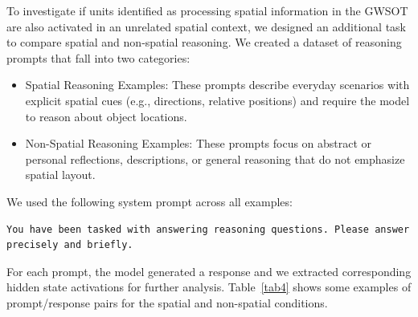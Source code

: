 \documentclass[runningheads]{llncs}
\begin{document}
To investigate if units identified as processing spatial information in the GWSOT are also activated in an unrelated spatial context, we designed an additional task to compare spatial and non-spatial reasoning. We created a dataset of reasoning prompts that fall into two categories:

\begin{samepage} %
\begin{itemize}[label={\scalebox{1}{$\bullet$}}, leftmargin=*] %
    \item Spatial Reasoning Examples: These prompts describe everyday scenarios with explicit spatial cues (e.g., directions, relative positions) and require the model to reason about object locations.
    \item Non-Spatial Reasoning Examples: These prompts focus on abstract or personal reflections, descriptions, or general reasoning that do not emphasize spatial layout.
\end{itemize}
\end{samepage}


We used the following system prompt across all examples:

\begin{lstlisting}[basicstyle=\ttfamily\small, breaklines=true, frame=single]
You have been tasked with answering reasoning questions. Please answer precisely and briefly.
\end{lstlisting}

For each prompt, the model generated a response and we extracted corresponding hidden state activations for further analysis. Table~\ref{tab4} shows some examples of prompt/response pairs for the spatial and non-spatial conditions.
\end{document}
